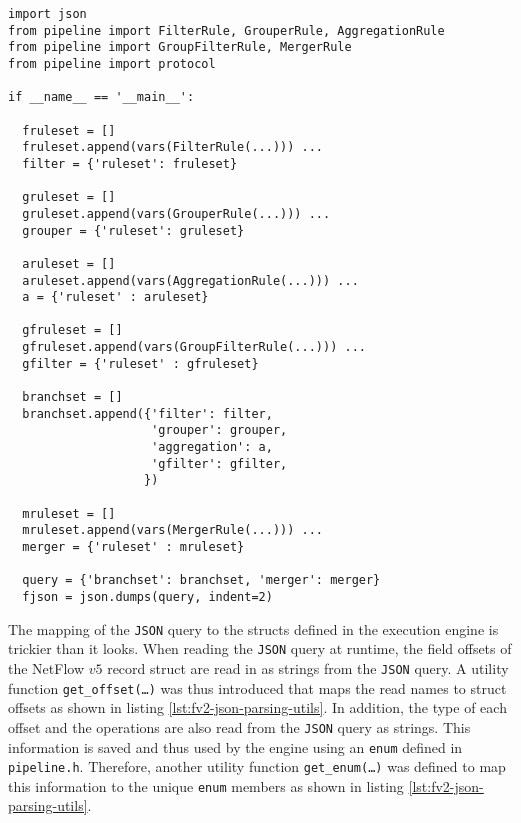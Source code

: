 \begin{lstlisting}
import json
from pipeline import FilterRule, GrouperRule, AggregationRule
from pipeline import GroupFilterRule, MergerRule
from pipeline import protocol

if __name__ == '__main__':

  fruleset = []
  fruleset.append(vars(FilterRule(...))) ...
  filter = {'ruleset': fruleset}

  gruleset = []
  gruleset.append(vars(GrouperRule(...))) ...
  grouper = {'ruleset': gruleset}

  aruleset = []
  aruleset.append(vars(AggregationRule(...))) ...
  a = {'ruleset' : aruleset}

  gfruleset = []
  gfruleset.append(vars(GroupFilterRule(...))) ...
  gfilter = {'ruleset' : gfruleset}

  branchset = []
  branchset.append({'filter': filter,
                    'grouper': grouper,
                    'aggregation': a,
                    'gfilter': gfilter,
                   })

  mruleset = []
  mruleset.append(vars(MergerRule(...))) ...
  merger = {'ruleset' : mruleset}

  query = {'branchset': branchset, 'merger': merger}
  fjson = json.dumps(query, indent=2)
\end{lstlisting}






The mapping of the \texttt{JSON} query to the structs defined in the execution
engine is trickier than it looks. When reading the \texttt{JSON} query at
runtime, the field offsets of the NetFlow $v5$ record struct are read in as
strings from the \texttt{JSON} query. A utility function
\texttt{get\_offset(\ldots)} was thus 
introduced that maps the read names to struct offsets as shown in listing
\ref{lst:fv2-json-parsing-utils}.  In addition, the type of each offset and
the operations are also read from the \texttt{JSON} query as strings. This
information is saved and thus used by the engine using an \texttt{enum}
defined in \texttt{pipeline.h}.  Therefore, another utility function
\texttt{get\_enum(\ldots)} was defined to map this information to the unique
\texttt{enum} members as shown in listing \ref{lst:fv2-json-parsing-utils}.


